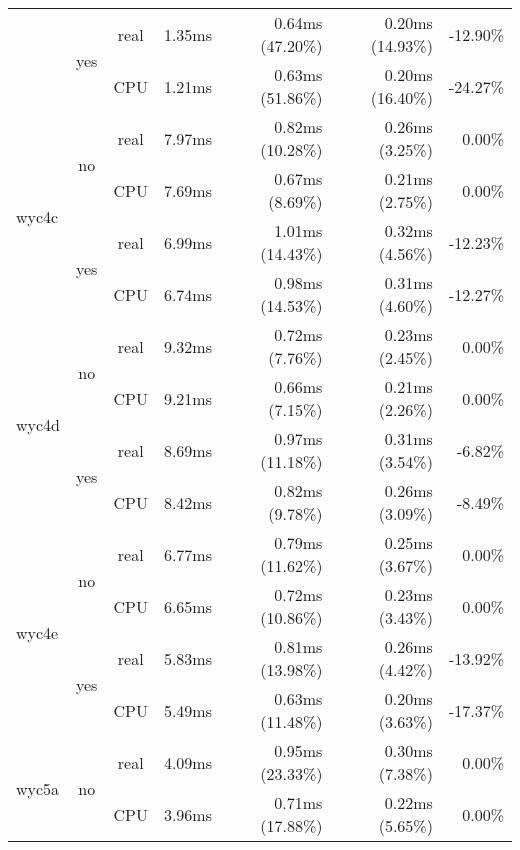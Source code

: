 \documentclass[en]{pracamgr}
\begin{document}
\begin{small}
\begin{longtable}{|l|c|c|r|r|r|r|}
                          \cline{2-7}
                          & \multirow{2}{*}{yes} & real & 1.35ms & 0.64ms (47.20\%) & 0.20ms (14.93\%) & -12.90\% \\*
                          &                      & CPU  & 1.21ms & 0.63ms (51.86\%) & 0.20ms (16.40\%) & -24.27\% \\
\hline
\multirow{4}{*}{wyc4c}    & \multirow{2}{*}{no}  & real & 7.97ms & 0.82ms (10.28\%) & 0.26ms (3.25\%) & 0.00\% \\*
                          &                      & CPU  & 7.69ms & 0.67ms (8.69\%) & 0.21ms (2.75\%) & 0.00\% \\*
                          \cline{2-7}
                          & \multirow{2}{*}{yes} & real & 6.99ms & 1.01ms (14.43\%) & 0.32ms (4.56\%) & -12.23\% \\*
                          &                      & CPU  & 6.74ms & 0.98ms (14.53\%) & 0.31ms (4.60\%) & -12.27\% \\
\hline
\multirow{4}{*}{wyc4d}    & \multirow{2}{*}{no}  & real & 9.32ms & 0.72ms (7.76\%) & 0.23ms (2.45\%) & 0.00\% \\*
                          &                      & CPU  & 9.21ms & 0.66ms (7.15\%) & 0.21ms (2.26\%) & 0.00\% \\*
                          \cline{2-7}
                          & \multirow{2}{*}{yes} & real & 8.69ms & 0.97ms (11.18\%) & 0.31ms (3.54\%) & -6.82\% \\*
                          &                      & CPU  & 8.42ms & 0.82ms (9.78\%) & 0.26ms (3.09\%) & -8.49\% \\
\hline
\multirow{4}{*}{wyc4e}    & \multirow{2}{*}{no}  & real & 6.77ms & 0.79ms (11.62\%) & 0.25ms (3.67\%) & 0.00\% \\*
                          &                      & CPU  & 6.65ms & 0.72ms (10.86\%) & 0.23ms (3.43\%) & 0.00\% \\*
                          \cline{2-7}
                          & \multirow{2}{*}{yes} & real & 5.83ms & 0.81ms (13.98\%) & 0.26ms (4.42\%) & -13.92\% \\*
                          &                      & CPU  & 5.49ms & 0.63ms (11.48\%) & 0.20ms (3.63\%) & -17.37\% \\
\hline
\multirow{4}{*}{wyc5a}    & \multirow{2}{*}{no}  & real & 4.09ms & 0.95ms (23.33\%) & 0.30ms (7.38\%) & 0.00\% \\*
                          &                      & CPU  & 3.96ms & 0.71ms (17.88\%) & 0.22ms (5.65\%) & 0.00\% \\*

\end{longtable}
\end{small}
\end{document}
